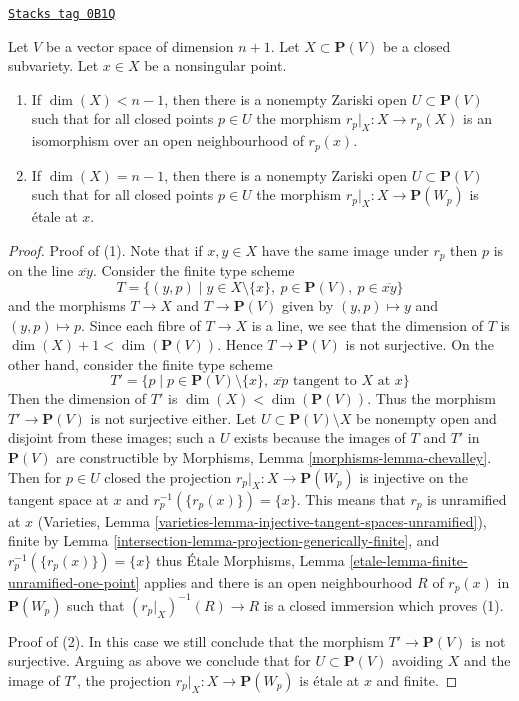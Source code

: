 \begin{lemma}
\label{intersection-lemma-projection-generically-immersion}
\href{https://stacks.math.columbia.edu/tag/0B1Q}{\texttt{Stacks tag 0B1Q}}

Let $V$ be a vector space of dimension $n + 1$.
Let $X \subset \mathbf{P}(V)$ be a closed subvariety.
Let $x \in X$ be a nonsingular point.
\begin{enumerate}
\item If $\dim(X) < n - 1$, then there is a nonempty Zariski open
$U \subset \mathbf{P}(V)$ such that for all closed points $p \in U$ the
morphism $r_p|_X : X \to r_p(X)$ is an
isomorphism over an open neighbourhood of $r_p(x)$.
\item If $\dim(X) = n - 1$, then there is a nonempty Zariski open
$U \subset \mathbf{P}(V)$ such that for all closed points $p \in U$ the
morphism $r_p|_X : X \to \mathbf{P}(W_p)$ is \'etale at $x$.
\end{enumerate}
\end{lemma}

\begin{proof}

Proof of (1). Note that if $x, y \in X$ have the same image under
$r_p$ then $p$ is on the line $\overline{xy}$.
Consider the finite type scheme
$$
T = \{(y, p) \mid
y \in X \setminus \{x\},\ p \in \mathbf{P}(V),\ p \in \overline{xy}\}
$$
and the morphisms $T \to X$ and $T \to \mathbf{P}(V)$ given by
$(y, p) \mapsto y$ and $(y, p) \mapsto p$.
Since each fibre of $T \to X$ is a line, we see that
the dimension of $T$ is $\dim(X) + 1 < \dim(\mathbf{P}(V))$.
Hence $T \to \mathbf{P}(V)$ is not surjective. On the other hand,
consider the finite type scheme
$$
T' = \{p \mid
p \in \mathbf{P}(V) \setminus \{x\},
\ \overline{xp}\text{ tangent to }X\text{ at }x\}
$$
Then the dimension of $T'$ is $\dim(X) < \dim(\mathbf{P}(V))$.
Thus the morphism $T' \to \mathbf{P}(V)$ is not surjective either.
Let $U \subset \mathbf{P}(V) \setminus X$ be nonempty open and disjoint
from these images; such a $U$ exists because the images of $T$ and $T'$
in $\mathbf{P}(V)$ are constructible by
Morphisms, Lemma \ref{morphisms-lemma-chevalley}.
Then for $p \in U$ closed the projection
$r_p|_X : X \to \mathbf{P}(W_p)$ is injective on the
tangent space at $x$ and $r_p^{-1}(\{r_p(x)\}) = \{x\}$.
This means that $r_p$ is unramified at $x$
(Varieties, Lemma \ref{varieties-lemma-injective-tangent-spaces-unramified}),
finite by Lemma \ref{intersection-lemma-projection-generically-finite},
and $r_p^{-1}(\{r_p(x)\}) = \{x\}$ thus \'Etale Morphisms, Lemma
\ref{etale-lemma-finite-unramified-one-point} applies and
there is an open neighbourhood $R$ of $r_p(x)$
in $\mathbf{P}(W_p)$ such that $(r_p|_X)^{-1}(R) \to R$ is a
closed immersion which proves (1).

\medskip\noindent
Proof of (2). In this case we still conclude that the morphism
$T' \to \mathbf{P}(V)$ is not surjective.
Arguing as above we conclude that for $U \subset \mathbf{P}(V)$
avoiding $X$ and the image of $T'$, the projection
$r_p|_X : X \to \mathbf{P}(W_p)$ is \'etale at $x$ and finite.
\end{proof}

